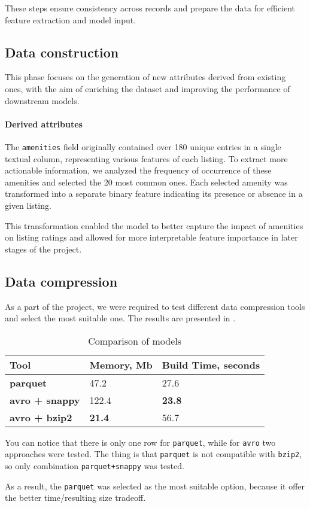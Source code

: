 These steps ensure consistency across records and prepare the data for efficient feature extraction and model input.

\subsection{Data construction}\label{sec:dataConstruction}
This phase focuses on the generation of new attributes derived from existing ones, with the aim of enriching the dataset and improving the performance of downstream models.

\paragraph{Derived attributes}
The \texttt{amenities} field originally contained over 180 unique entries in a single textual column, representing various features of each listing. To extract more actionable information, we analyzed the frequency of occurrence of these amenities and selected the 20 most common ones. Each selected amenity was transformed into a separate binary feature indicating its presence or absence in a given listing.

This transformation enabled the model to better capture the impact of amenities on listing ratings and allowed for more interpretable feature importance in later stages of the project.

\subsection{Data compression}\label{sec:dataCompression}
As a part of the project, we were required to test different data compression tools and select the most suitable one. The results are presented in .

\begin{table}[ht!]
  \small
  \centering
  \caption{Comparison of models}\label{tab:compression_comp}
  \begin{tabular}{lll}
    \toprule
    Tool                   & {Memory, Mb}  & {Build Time, seconds} \\
    \midrule
    \textbf{parquet}       & 47.2          & 27.6                  \\
    \textbf{avro + snappy} & 122.4         & \textbf{23.8}         \\
    \textbf{avro + bzip2}  & \textbf{21.4} & 56.7                  \\
    \bottomrule
  \end{tabular}
\end{table}

You can notice that there is only one row for \texttt{parquet}, while for \texttt{avro} two approaches were tested. The thing is that \texttt{parquet} is not compatible with \texttt{bzip2}, so only combination \texttt{parquet+snappy} was tested.

As a result, the \texttt{parquet} was selected as the most suitable option, because it offer the better time/resulting size tradeoff.